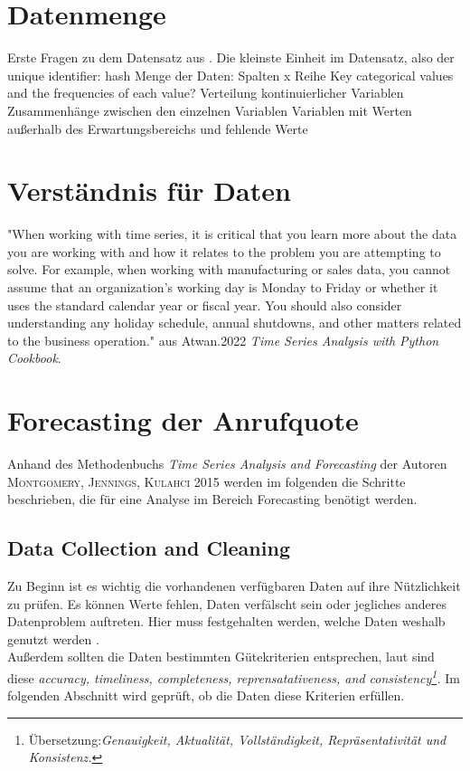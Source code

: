 \documentclass[12pt]{report}
\begin{document}
	\section{Datenmenge}
	Erste Fragen zu dem Datensatz aus \cite[S.77f.]{Walker.2024}.
	Die kleinste Einheit im Datensatz, also der unique identifier: hash
	Menge der Daten: Spalten x Reihe
	Key categorical values and the frequencies of each value?
	Verteilung kontinuierlicher Variablen
	Zusammenhänge zwischen den einzelnen Variablen
	Variablen mit Werten außerhalb des Erwartungsbereichs und fehlende Werte
	
	\section{Verständnis für Daten}
	"When working with time series, it is critical that you learn more about the data you are working with and how it relates to the problem you are attempting to solve. For example, when working with manufacturing or sales data, you cannot assume that an organization's working day is Monday to Friday or whether it uses the standard calendar year or fiscal year. You should also consider understanding any holiday schedule, annual shutdowns, and other matters related to the business operation." aus Atwan.2022 \textit{Time Series Analysis with Python Cookbook}.
	\section{Forecasting der Anrufquote}
	Anhand des Methodenbuchs \textit{Time Series Analysis and Forecasting} der Autoren \textsc{Montgomery, Jennings, Kulahci} 2015 \cite{Montgomery.2015} werden im folgenden die Schritte beschrieben, die für eine Analyse im Bereich Forecasting benötigt werden.\\
	\subsection{Data Collection and Cleaning}
	Zu Beginn ist es wichtig die vorhandenen verfügbaren Daten auf ihre Nützlichkeit zu prüfen. Es können Werte fehlen, Daten verfälscht sein oder jegliches anderes Datenproblem auftreten. Hier muss festgehalten werden, welche Daten weshalb genutzt werden \cite[14]{Montgomery.2015}. \\
	Außerdem sollten die Daten bestimmten Gütekriterien entsprechen, laut \cite[17]{Montgomery.2015} sind diese \textit{ \glqq accuracy, timeliness, completeness, reprensatativeness, and consistency\footnote{Übersetzung:\textit{\glqq Genauigkeit, Aktualität, Vollständigkeit, Repräsentativität und Konsistenz.\grqq }}.\grqq} Im folgenden Abschnitt wird geprüft, ob die Daten diese Kriterien erfüllen.
\end{document}
